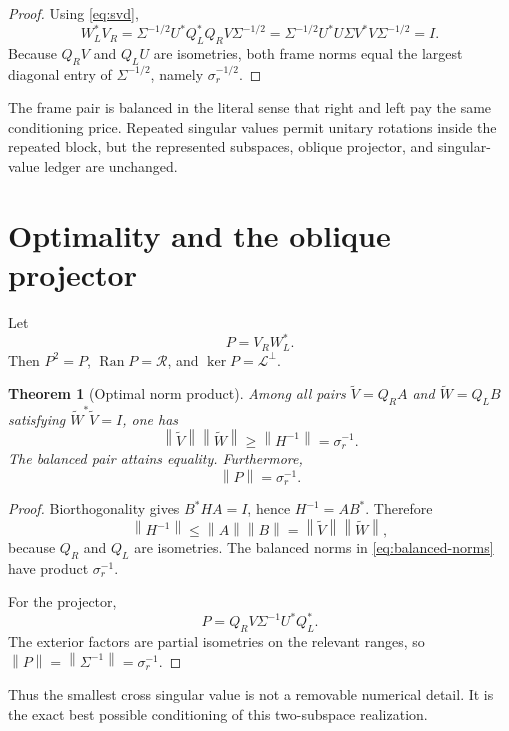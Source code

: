 \documentclass[12pt]{article}
\newtheorem{theorem}{Theorem}[section]
\theoremstyle{remark}
\newcommand{\cR}{\mathcal R}
\newcommand{\cL}{\mathcal L}
\newcommand{\norm}[1]{\left\lVert#1\right\rVert}
\begin{document}
\begin{proof}
Using \eqref{eq:svd},
\[
 W_L^*V_R
 =\Sigma^{-1/2}U^*Q_L^*Q_RV\Sigma^{-1/2}
 =\Sigma^{-1/2}U^*U\Sigma V^*V\Sigma^{-1/2}=I.
\]
Because $Q_RV$ and $Q_LU$ are isometries, both frame norms equal the largest
diagonal entry of $\Sigma^{-1/2}$, namely $\sigma_r^{-1/2}$.
\end{proof}

The frame pair is balanced in the literal sense that right and left pay the
same conditioning price.  Repeated singular values permit unitary rotations
inside the repeated block, but the represented subspaces, oblique projector,
and singular-value ledger are unchanged.

\section{Optimality and the oblique projector}

Let
\begin{equation}\label{eq:projector}
 P=V_RW_L^*.
\end{equation}
Then $P^2=P$, $\operatorname{Ran}P=\cR$, and
$\ker P=\cL^\perp$.

\begin{theorem}[Optimal norm product]\label{thm:optimal}
Among all pairs $\widetilde V=Q_RA$ and $\widetilde W=Q_LB$ satisfying
$\widetilde W^*\widetilde V=I$, one has
\begin{equation}\label{eq:lower-product}
 \norm{\widetilde V}\norm{\widetilde W}
 \ge \norm{H^{-1}}=\sigma_r^{-1}.
\end{equation}
The balanced pair attains equality.  Furthermore,
\begin{equation}\label{eq:projector-norm}
 \norm P=\sigma_r^{-1}.
\end{equation}
\end{theorem}

\begin{proof}
Biorthogonality gives $B^*HA=I$, hence
$H^{-1}=AB^*$.  Therefore
\[
 \norm{H^{-1}}\le\norm A\norm B
 =\norm{\widetilde V}\norm{\widetilde W},
\]
because $Q_R$ and $Q_L$ are isometries.  The balanced norms in
\eqref{eq:balanced-norms} have product $\sigma_r^{-1}$.

For the projector,
\[
 P=Q_RV\Sigma^{-1}U^*Q_L^*.
\]
The exterior factors are partial isometries on the relevant ranges, so
$\norm P=\norm{\Sigma^{-1}}=\sigma_r^{-1}$.
\end{proof}

Thus the smallest cross singular value is not a removable numerical detail.
It is the exact best possible conditioning of this two-subspace realization.
\end{document}
